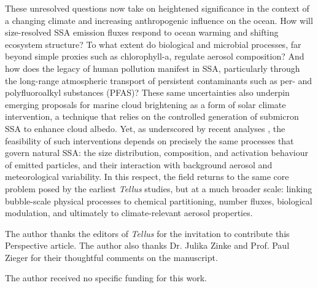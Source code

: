 \documentclass[ProofPDF]{./Styles/Jnls-Template-V3}
\begin{document}
These unresolved questions now take on heightened significance in the context of a changing climate and increasing anthropogenic influence on the ocean. How will size-resolved SSA emission fluxes respond to ocean warming and shifting ecosystem structure? To what extent do biological and microbial processes, far beyond simple proxies such as chlorophyll-a, regulate aerosol composition? And how does the legacy of human pollution manifest in SSA, particularly through the long-range atmospheric transport of persistent contaminants such as per- and polyfluoroalkyl substances (PFAS)? These same uncertainties also underpin emerging proposals for marine cloud brightening as a form of solar climate intervention, a technique that relies on the controlled generation of submicron SSA to enhance cloud albedo. Yet, as underscored by recent analyses \citep[e.g.][]{Feingold2024}, the feasibility of such interventions depends on precisely the same processes that govern natural SSA: the size distribution, composition, and activation behaviour of emitted particles, and their interaction with background aerosol and meteorological variability. In this respect, the field returns to the same core problem posed by the earliest \textit{Tellus} studies, but at a much broader scale: linking bubble-scale physical processes to chemical partitioning, number fluxes, biological modulation, and ultimately to climate-relevant aerosol properties.



\theendnotes

\begin{acknowledgements}[Acknowledgements]
The author thanks the editors of \textit{Tellus} for the invitation to contribute this Perspective article. The author also thanks Dr. Julika Zinke and Prof. Paul Zieger for their thoughtful comments on the manuscript.
\end{acknowledgements}

\begin{fundinginfo}
The author received no specific funding for this work.
\end{fundinginfo}

\eject
\begin{authoraff}[AUTHOR AFFILIATIONS]
\end{authoraff}




\label{endPage_Label}
\end{document}
